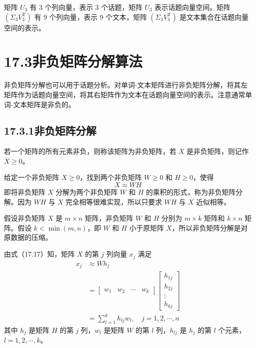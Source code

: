 \documentclass[UTF8,12pt,a4paper,fontset=fandol]{ctexart}
\begin{document}
矩阵 $U_3$ 有 3 个列向量，表示 3 个话题，矩阵 $U_3$ 表示话题向量空间。矩阵 $(\Sigma_3V_3^{\mathrm{T}})$ 有 9 个列向量，表示 9 个文本，矩阵 $(\Sigma_3V_3^{\mathrm{T}})$ 是文本集合在话题向量空间的表示。

\section*{17.3\quad 非负矩阵分解算法}

非负矩阵分解也可以用于话题分析。对单词-文本矩阵进行非负矩阵分解，将其左矩阵作为话题向量空间，将其右矩阵作为文本在话题向量空间的表示。注意通常单词-文本矩阵是非负的。

\subsection*{17.3.1\quad 非负矩阵分解}

若一个矩阵的所有元素非负，则称该矩阵为非负矩阵，若 $X$ 是非负矩阵，则记作 $X\geqslant 0$。

给定一个非负矩阵 $X\geqslant 0$，找到两个非负矩阵 $W\geqslant 0$ 和 $H\geqslant 0$，使得
\begin{equation}
X\approx WH
\tag{17.17}
\end{equation}
即将非负矩阵 $X$ 分解为两个非负矩阵 $W$ 和 $H$ 的乘积的形式，称为非负矩阵分解。因为 $WH$ 与 $X$ 完全相等很难实现，所以只要求 $WH$ 与 $X$ 近似相等。

假设非负矩阵 $X$ 是 $m\times n$ 矩阵，非负矩阵 $W$ 和 $H$ 分别为 $m\times k$ 矩阵和 $k\times n$ 矩阵。假设 $k<\min(m,n)$，即 $W$ 和 $H$ 小于原矩阵 $X$，所以非负矩阵分解是对原数据的压缩。

由式（17.17）知，矩阵 $X$ 的第 $j$ 列向量 $x_j$ 满足
\begin{equation}
\begin{aligned}
x_j&\approx Wh_j\\
&=
\begin{bmatrix}
w_1 & w_2 & \cdots & w_k
\end{bmatrix}
\begin{bmatrix}
h_{1j}\\
h_{2j}\\
\vdots\\
h_{kj}
\end{bmatrix}\\
&=\sum_{l=1}^k h_{lj}w_l,\quad j=1,2,\cdots,n
\end{aligned}
\tag{17.18}
\end{equation}
其中 $h_j$ 是矩阵 $H$ 的第 $j$ 列，$w_l$ 是矩阵 $W$ 的第 $l$ 列，$h_{lj}$ 是 $h_j$ 的第 $l$ 个元素，$l=1,2,\cdots,k$。
\end{document}
